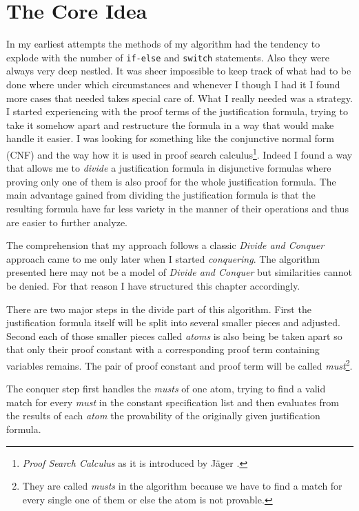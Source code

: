 \section{The Core Idea}
In my earliest attempts the methods of my algorithm had the tendency to explode with the number of \texttt{if-else} and \texttt{switch} statements. Also they were always very deep nestled. It was sheer impossible to keep track of what had to be done where under which circumstances and whenever I though I had it I found more cases that needed takes special care of. What I really needed was a strategy. I started experiencing with the proof terms of the justification formula, trying to take it somehow apart and restructure the formula in a way that would make handle it easier. I was looking for something like the conjunctive normal form (CNF) and the way how it is used in proof search calculus\footnote{\emph{Proof Search Calculus} as it is introduced by Jäger \cite{jaeg}.}. Indeed I found a way that allows me to \emph{divide} a justification formula in disjunctive formulas where proving only one of them is also proof for the whole justification formula. The main advantage gained from dividing the justification formula is that the resulting formula have far less variety in the manner of their operations and thus are easier to further analyze.

The comprehension that my approach follows a classic \emph{Divide and Conquer} approach came to me only later when I started \emph{conquering}. The algorithm presented here may not be a model of \emph{Divide and Conquer} but similarities cannot be denied. For that reason I have structured this chapter accordingly.

\medskip

There are two major steps in the divide part of this algorithm. First the justification formula itself will be split into several smaller pieces and adjusted. Second each of those smaller pieces called \emph{atoms} is also being be taken apart so that only their proof constant with a corresponding proof term containing variables remains. The pair of proof constant and proof term will be called \emph{must}\footnote{They are called \emph{musts} in the algorithm because we have to find a match for every single one of them or else the atom is not provable.}.

The conquer step first handles the \emph{musts} of one atom, trying to find a valid match for every \emph{must} in the constant specification list and then evaluates from the results of each \emph{atom} the provability of the originally given justification formula.

